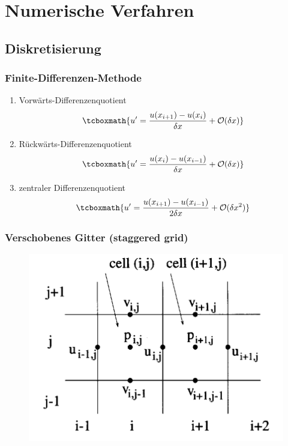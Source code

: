 

	\section{Numerische Verfahren} %
	\label{sec:numerische_verfahren}
	
		\subsection{Diskretisierung} %
		\label{sub:diskretisierung}
		
			\begin{frame}
				\frametitle{Finite-Differenzen-Methode}
				\begin{enumerate}[label=(\roman*)]
					\item Vorwärts-Differenzenquotient
						\[ \tcboxmath{ u^\prime = \frac{u(x_{i+1}) - u(x_i)}{\delta x} + \mathcal{O}(\delta x) } \]
					\item Rückwärts-Differenzenquotient
						\[ \tcboxmath{ u^\prime = \frac{u(x_{i}) - u(x_{i-1})}{\delta x} + \mathcal{O}(\delta x) } \]
					\item zentraler Differenzenquotient
						\[ \tcboxmath{ u^\prime = \frac{u(x_{i+1}) - u(x_{i-1})}{2\delta x} + \mathcal{O}(\delta x^2) } \]
				\end{enumerate}
			\end{frame}

			\begin{frame}
				\frametitle{Verschobenes Gitter (staggered grid)}
				\begin{figure}
					\centering
					\includegraphics[scale = 0.30]{staggered-grid.png}
				\end{figure}
			\end{frame}

